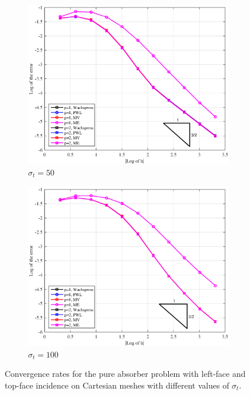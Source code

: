 \begin{figure}
{}
\vspace{1cm}
{
	\begin{subfigure}[b]{0.485\textwidth}
		\centering
		\label{subfig::PA_LeftTop_Cart_sig50}
		\includegraphics[width=\textwidth]{figures/sec_BF/PAErr_LeftTop_Cart_sig50.eps}
	\caption{$\sigma_t = 50$}
	\end{subfigure}
	\hfill
	\begin{subfigure}[b]{0.485\textwidth}
		\centering
		\label{subfig::PA_LeftTop_Cart_sig100}
		\includegraphics[width=\textwidth]{figures/sec_BF/PAErr_LeftTop_Cart_sig100.eps}
	\caption{$\sigma_t = 100$}
	\end{subfigure}
}
\caption{Convergence rates for the pure absorber problem with left-face and top-face incidence on Cartesian meshes with different values of $\sigma_t$.}
\label{fig::BF_Results_PA_LeftTop_Cart}
\end{figure}


